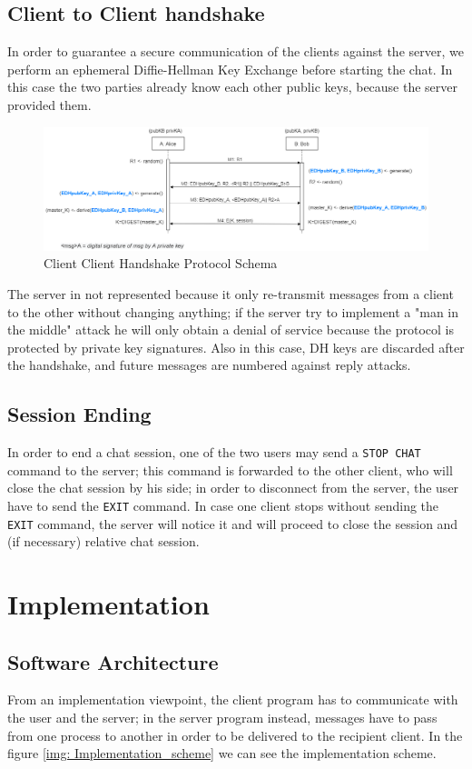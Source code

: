 \documentclass[11pt]{report}
\begin{document}
\section{Client to Client handshake}
In order to guarantee a secure communication of the clients against the server, we perform an ephemeral 
Diffie-Hellman Key Exchange before starting the chat. In this case the two parties already know each other
public keys, because the server provided them. 

\begin{figure}[H]
	\centering
	\includegraphics[scale=0.4]{img/AuthClientClientVer2.png}
	\caption{Client Client Handshake Protocol Schema}
	\label {img: AuthClientClient}
\end{figure}

\noindent The server in not represented because it only re-transmit messages from a client to the other without changing
anything; if the server try to implement a "man in the middle" attack he will only obtain a denial of service
because the protocol is protected by private key signatures. Also in this case, DH keys are discarded after 
the handshake, and future messages are numbered against reply attacks.

\section{Session Ending}
In order to end a chat session, one of the two users may send a \texttt{STOP CHAT} command to the server; this
command is forwarded to the other client, who will close the chat session by his side; in order to disconnect from the server, the user have to send the 
\texttt{EXIT} command. In case one client stops without sending the \texttt{EXIT} command, the server will notice 
it and will proceed to close the session and (if necessary) relative chat session.


\chapter{Implementation}
\section{Software Architecture}
From an implementation viewpoint, the client program has to communicate with the user and the server; in the
server program instead, messages have to pass from one process to another in order to be delivered to the
recipient client. In the figure \ref{img: Implementation_scheme} we can see the implementation scheme.
\end{document}
